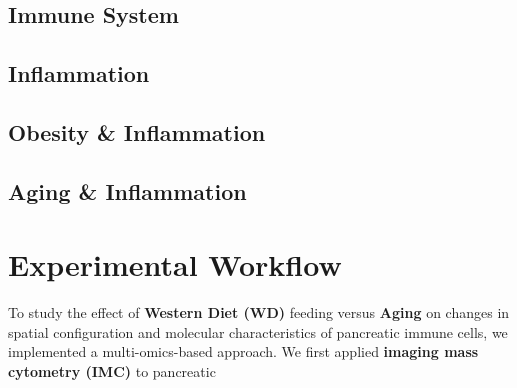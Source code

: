 \subsection{Immune System}
\subsection{Inflammation}
\subsection{Obesity \& Inflammation}
\subsection{Aging \& Inflammation}


\newpage

\section{Experimental Workflow}
\label{sec:chp2_workflow}

To study the effect of \textbf{Western Diet (WD)} feeding versus \textbf{Aging} on changes in spatial configuration and molecular characteristics of pancreatic immune cells, we implemented a multi-omics-based approach. We first applied \textbf{imaging mass cytometry (IMC)} to pancreatic

